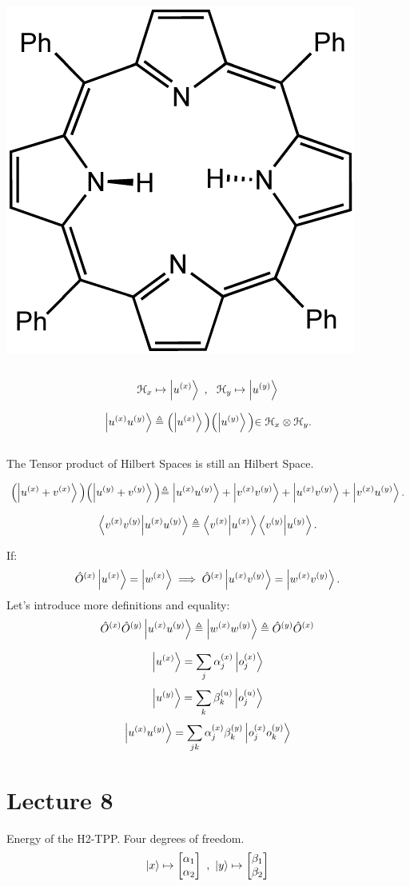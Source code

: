 \documentclass{article}
\begin{document}
\includegraphics[]{H2TPP.png}
\\ \\
$$\mathcal{H}_x \mapsto \ket{u^{(x)}} \ ,\ \ \mathcal{H}_y \mapsto \ket{u^{(y)}}$$

$$ \ket{u^{(x)}u^{(y)}} \triangleq \Bigl( \ket{u^{(x)}} \Bigl) \Bigl( \ket{u^{(y)}} \Bigl) \in \mathcal{H}_x \otimes \mathcal{H}_y.$$ \\
The Tensor product of Hilbert Spaces is still an Hilbert Space. 

$$ \Bigl( \ket{u^{(x)} + v^{(x)}} \Bigl) \Bigl( \ket{u^{(y)}+ v^{(y)}} \Bigl) \triangleq \ket{u^{(x)} u^{(y)}} + \ket{v^{(x)}v^{(y)}} + \ket{u^{(x)}v^{(y)}}+\ket{v^{(x)}u^{(y)}}.$$

$$\bra{v^{(x)} v^{(y)}} \ket{{u^{(x)}u^{(y)}}} \triangleq \bra{v^{(x)}}\ket{u^{(x)}} \bra{v^{(y)}}\ket{u^{(y)}}.$$

If: $$\hat{O}^{(x)} \ket{u^{(x)}} = \ket{w^{(x)}} \implies \hat{O}^{(x)} \ket{u^{(x)}v^{(y)}} = \ket{w^{(x)}v^{(y)}}.$$
Let's introduce more definitions and equality:
$$\hat{O}^{(x)}\hat{O}^{(y)}\ket{u^{(x)}u^{(y)}} \triangleq \ket{w^{(x)}w^{(y)}} \triangleq \hat{O}^{(y)}\hat{O}^{(x)}$$

$$\ket{u^{(x)}} = \sum_j \alpha_j^{(x)} \ket{o_j^{(x)}}$$
$$\ket{u^{(y)}} = \sum_k \beta_k^{(u)} \ket{o_j^{(u)}} $$
$$\ket{u^{(x)}u^{(y)}} = \sum_{jk} \alpha_j^{(x)}\beta_k^{(y)} \ket{o_j^{(x)}o_k^{(y)}}$$

\section{ Lecture 8}
Energy of the H2-TPP. Four degrees of freedom.
$$\ket{x} \mapsto \begin{bmatrix}
    \alpha_1 \\
    \alpha_2 \\
\end{bmatrix} \ , \ \ket{y} \mapsto \begin{bmatrix}
    \beta_1 \\
    \beta_2 \\
\end{bmatrix}$$
\end{document}
